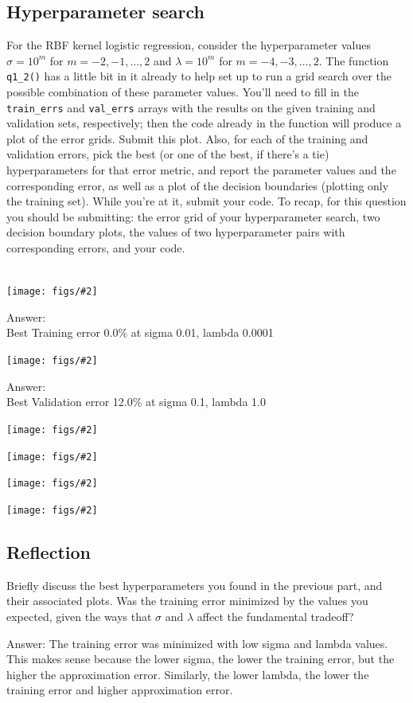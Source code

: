 \documentclass{article}
\def\ans#1{\par\gre{Answer: #1}}
\def\blu#1{{\color{blu}#1}}
\def\gre#1{{\color{gre}#1}}
\newcommand{\centerfig}[2]{\begin{center}\texttt{[image: figs/\#2]}\end{center}}
\begin{document}
\pagebreak 

\subsection{Hyperparameter search}

For the RBF kernel logistic regression, consider the hyperparameter values $\sigma=10^m$ for $m=-2,-1,\ldots,2$ and $\lambda=10^m$ for $m=-4,-3,\ldots,2$.
The function \verb|q1_2()| has a little bit in it already to help set up to run a grid search over the possible combination of these parameter values.
You'll need to fill in the \verb|train_errs| and \verb|val_errs| arrays
with the results on the given training and validation sets, respectively;
then the code already in the function will produce a plot of the error grids.
\blu{Submit this plot}.
Also, for each of the training and validation errors,
pick the best (or one of the best, if there's a tie) hyperparameters for that error metric,
and \blu{report the parameter values and the corresponding error, as well as a plot of the decision boundaries (plotting only the training set)}.
While you're at it, \blu{submit your code}.
To recap, for this question you should be submitting:
the error grid of your hyperparameter search, two decision boundary plots,
the values of two hyperparameter pairs with corresponding errors,
and your code.
\\\\
\centerfig{1}{logRegRBF_grids.png}
\ans{\\
Best Training error 0.0\% at sigma 0.01, lambda 0.0001 \\
}
\centerfig{0.6}{logRegRBFBestTrain}
\ans{\\
Best Validation error 12.0\% at sigma 0.1, lambda 1.0 \\
}
\centerfig{0.6}{logRegRBFBestVal}

\centerfig{0.6}{q1.2-code1}
\centerfig{0.6}{q1.2-code2}
\centerfig{0.6}{q1.2-code3}

\pagebreak 

\subsection{Reflection}
\blu{Briefly discuss the best hyperparameters you found in the previous part, and their associated plots. Was the training error minimized by the values you expected, given the ways that $\sigma$ and $\lambda$ affect the fundamental tradeoff?}
\ans{The training error was minimized with low sigma and lambda values. This makes sense because the lower sigma, the lower the training error, but the higher the approximation error. Similarly, the lower lambda, the lower the training error and higher approximation error.}
\pagebreak
\end{document}
